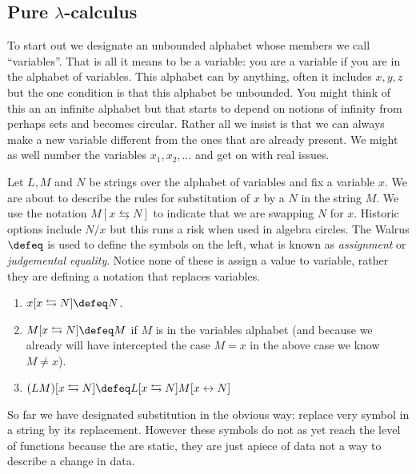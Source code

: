 \subsection{Pure $\lambda$-calculus}

To start out we designate an unbounded alphabet whose members we call ``variables''.
That is all it means to be a variable: you are a variable if you are in the alphabet of variables.  This alphabet 
can by anything, often it includes $x,y,z$ but the one condition is that 
this alphabet be unbounded.  You might think of this an an infinite alphabet but that starts to depend on notions of infinity from perhaps sets and becomes circular.
Rather all we insist is that we can always make a new variable different 
from the ones that are already present.  We might as well number the variables $x_1,x_2,\ldots$ and get on with real issues.

Let $L, M$ and $N$ be strings over the alphabet of variables
and fix a variable $x$.  We are about to describe the rules for substitution 
of $x$ by a $N$ in the string $M$.  We use the notation $M[x\leftrightarrows N]$ 
to indicate that we are swapping $N$ for $x$.  Historic 
options include $N/x$ but this runs a risk when used in algebra circles.
The Walrus $\defeq$ is used to define the symbols on the left, what is 
known as \emph{assignment} or \emph{judgemental equality}.  Notice none of 
these is assign a value to variable, rather they are defining a notation 
that replaces variables.
\begin{enumerate}
    \item $x[x\leftrightarrows N]\defeq N$.
    \item $M[x\leftrightarrows N]\defeq M$ if $M$ is in the variables alphabet (and 
    because we already will have intercepted the case $M=x$ in the above case we know $M\neq x$).
    
    \item $(LM)[x\leftrightarrows N]\defeq L[x\leftrightarrows N]M[x\leftrightarrow N]$
\end{enumerate}
So far we have designated substitution in the obvious way: replace very 
symbol in a string by its replacement.  However these symbols do not as 
yet reach the level of functions because the are static, they are just 
apiece of data not a way to describe a change in data.

